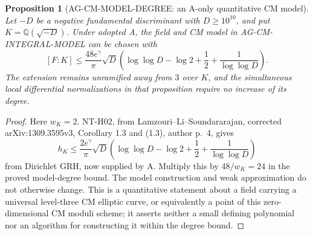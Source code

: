 \documentclass[11pt,a4paper]{article}
\newtheorem{proposition}{Proposition}
\begin{document}
\begin{proposition}[AG-CM-MODEL-DEGREE: an A-only quantitative CM model]
Let $-D$ be a negative fundamental discriminant with
$D\ge10^{10}$, and put $K=\mathbb Q(\sqrt{-D})$.
Under adopted A, the field and CM model in
AG-CM-INTEGRAL-MODEL can be chosen with
\[
 [F:K]\le\frac{48e^\gamma}{\pi}\sqrt D
    \left(\log\log D-\log2+\frac12+
                         \frac1{\log\log D}\right).
\]
The extension remains unramified away from $3$ over $K$,
and the simultaneous local differential normalizations in
that proposition require no increase of its degree.
\end{proposition}
\begin{proof}
Here $w_K=2$. NT-H02, from Lamzouri--Li--Soundararajan,
corrected arXiv:1309.3595v3, Corollary 1.3 and (1.3),
author p.~4, gives
\[
 h_K\le\frac{2e^\gamma}{\pi}\sqrt D
    \left(\log\log D-\log2+\frac12+
                         \frac1{\log\log D}\right)
\]
from Dirichlet GRH, now supplied by A.
Multiply this by $48/w_K=24$ in the proved model-degree
bound. The model construction and weak approximation do
not otherwise change. This is a quantitative statement about
a field carrying a universal level-three CM elliptic curve,
or equivalently a point of this zero-dimensional CM moduli
scheme; it asserts neither a small defining polynomial nor
an algorithm for constructing it within the degree bound.
\end{proof}
\end{document}
